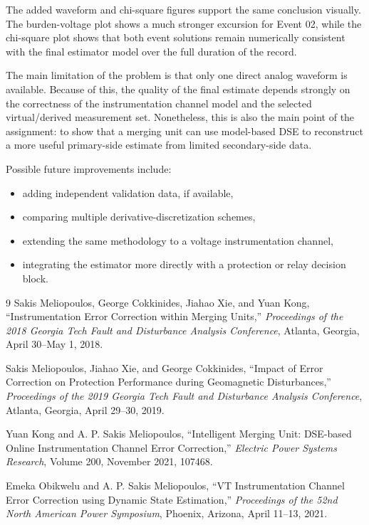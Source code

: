 \documentclass[11pt]{article}
\begin{document}
The added waveform and chi-square figures support the same conclusion visually. The burden-voltage
plot shows a much stronger excursion for Event 02, while the chi-square plot shows that both event
solutions remain numerically consistent with the final estimator model over the full duration of
the record.

The main limitation of the problem is that only one direct analog waveform is available. Because of
this, the quality of the final estimate depends strongly on the correctness of the instrumentation
channel model and the selected virtual/derived measurement set. Nonetheless, this is also the main
point of the assignment: to show that a merging unit can use model-based DSE to reconstruct a more
useful primary-side estimate from limited secondary-side data.

Possible future improvements include:
\begin{itemize}
  \item adding independent validation data, if available,
  \item comparing multiple derivative-discretization schemes,
  \item extending the same methodology to a voltage instrumentation channel,
  \item integrating the estimator more directly with a protection or relay decision block.
\end{itemize}

\begin{thebibliography}{9}
Sakis Meliopoulos, George Cokkinides, Jiahao Xie, and Yuan Kong,
``Instrumentation Error Correction within Merging Units,''
\emph{Proceedings of the 2018 Georgia Tech Fault and Disturbance Analysis Conference},
Atlanta, Georgia, April 30--May 1, 2018.

Sakis Meliopoulos, Jiahao Xie, and George Cokkinides,
``Impact of Error Correction on Protection Performance during Geomagnetic Disturbances,''
\emph{Proceedings of the 2019 Georgia Tech Fault and Disturbance Analysis Conference},
Atlanta, Georgia, April 29--30, 2019.

Yuan Kong and A. P. Sakis Meliopoulos,
``Intelligent Merging Unit: DSE-based Online Instrumentation Channel Error Correction,''
\emph{Electric Power Systems Research},
Volume 200, November 2021, 107468.

Emeka Obikwelu and A. P. Sakis Meliopoulos,
``VT Instrumentation Channel Error Correction using Dynamic State Estimation,''
\emph{Proceedings of the 52nd North American Power Symposium},
Phoenix, Arizona, April 11--13, 2021.
\end{thebibliography}
\end{document}
